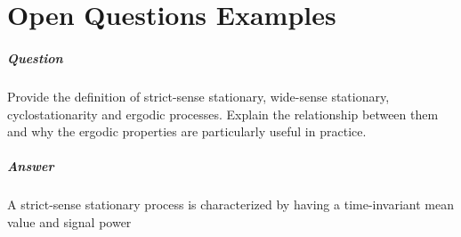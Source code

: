 \chapter{Open Questions Examples}

\newquestion
	\paragraph{Question} Provide the definition of strict-sense stationary, wide-sense stationary, cyclostationarity and ergodic processes. Explain the relationship between them and why the ergodic properties are particularly useful in practice.
	
	\paragraph{Answer} A strict-sense stationary process is characterized by having a time-invariant mean value and signal power 
